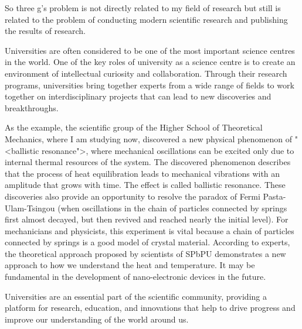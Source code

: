 \documentclass[main.tex]{subfiles}
\begin{document}
So three g's problem is not directly related to my field of research but still is related to the problem of conducting modern scientific research and publishing the results of research.
\\


\newpage


\setcounter{subsection}{4}

Universities are often considered to be one of the most important science centres in the world.
One of the key roles of university as a science centre is to create an environment of intellectual curiosity and collaboration.
Through their research programs, universities bring together experts from a wide range of fields to work together on interdisciplinary projects that can lead to new discoveries and breakthroughs.

As the example, the scientific group of the Higher School of Theoretical Mechanics, where I am studying now, discovered a new physical phenomenon of "<ballistic resonance">, where mechanical oscillations can be excited only due to internal thermal resources of the system.
The discovered phenomenon describes that the process of heat equilibration leads to mechanical vibrations with an amplitude that grows with time.
The effect is called ballistic resonance.
These discoveries also provide an opportunity to resolve the paradox of Fermi Pasta-Ulam-Tsingou (when oscillations in the chain of particles connected by springs first almost decayed, but then revived and reached nearly the initial level).
For mechanicians and physicists, this experiment is vital because a chain of particles connected by springs is a good model of crystal material.
According to experts, the theoretical approach proposed by scientists of SPbPU demonstrates a new approach to how we understand the heat and temperature.
It may be fundamental in the development of nano-electronic devices in the future.

Universities are an essential part of the scientific community, providing a platform for research, education, and innovations that help to drive progress and improve our understanding of the world around us.
\\


\newpage
\end{document}
